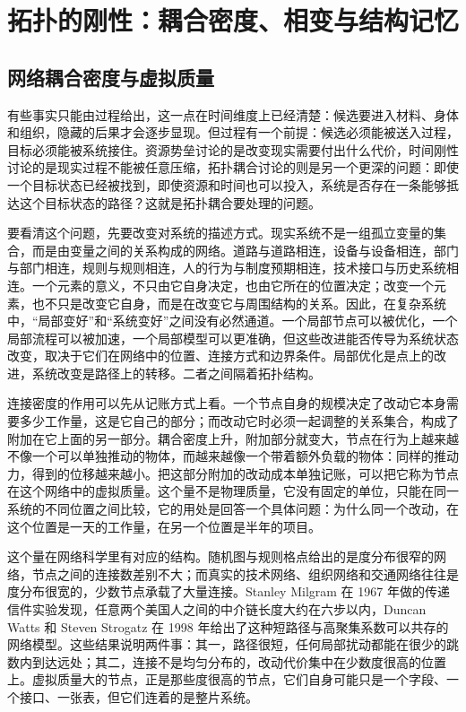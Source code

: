 \section{拓扑的刚性：耦合密度、相变与结构记忆}

\subsection{网络耦合密度与虚拟质量}

有些事实只能由过程给出，这一点在时间维度上已经清楚：候选要进入材料、身体和组织，隐藏的后果才会逐步显现。但过程有一个前提：候选必须能被送入过程，目标必须能被系统接住。资源势垒讨论的是改变现实需要付出什么代价，时间刚性讨论的是现实过程不能被任意压缩，拓扑耦合讨论的则是另一个更深的问题：即使一个目标状态已经被找到，即使资源和时间也可以投入，系统是否存在一条能够抵达这个目标状态的路径？这就是拓扑耦合要处理的问题。


要看清这个问题，先要改变对系统的描述方式。现实系统不是一组孤立变量的集合，而是由变量之间的关系构成的网络。道路与道路相连，设备与设备相连，部门与部门相连，规则与规则相连，人的行为与制度预期相连，技术接口与历史系统相连。一个元素的意义，不只由它自身决定，也由它所在的位置决定；改变一个元素，也不只是改变它自身，而是在改变它与周围结构的关系。因此，在复杂系统中，“局部变好”和“系统变好”之间没有必然通道。一个局部节点可以被优化，一个局部流程可以被加速，一个局部模型可以更准确，但这些改进能否传导为系统状态改变，取决于它们在网络中的位置、连接方式和边界条件。局部优化是点上的改进，系统改变是路径上的转移。二者之间隔着拓扑结构。

连接密度的作用可以先从记账方式上看。一个节点自身的规模决定了改动它本身需要多少工作量，这是它自己的部分；而改动它时必须一起调整的关系集合，构成了附加在它上面的另一部分。耦合密度上升，附加部分就变大，节点在行为上越来越不像一个可以单独推动的物体，而越来越像一个带着额外负载的物体：同样的推动力，得到的位移越来越小。把这部分附加的改动成本单独记账，可以把它称为节点在这个网络中的虚拟质量。这个量不是物理质量，它没有固定的单位，只能在同一系统的不同位置之间比较，它的用处是回答一个具体问题：为什么同一个改动，在这个位置是一天的工作量，在另一个位置是半年的项目。

这个量在网络科学里有对应的结构。随机图与规则格点给出的是度分布很窄的网络，节点之间的连接数差别不大；而真实的技术网络、组织网络和交通网络往往是度分布很宽的，少数节点承载了大量连接。Stanley Milgram 在 1967 年做的传递信件实验发现，任意两个美国人之间的中介链长度大约在六步以内\cite{milgram1967smallworld,travers1969experimental}，Duncan Watts 和 Steven Strogatz 在 1998 年给出了这种短路径与高聚集系数可以共存的网络模型\cite{watts1998collective}。这些结果说明两件事：其一，路径很短，任何局部扰动都能在很少的跳数内到达远处；其二，连接不是均匀分布的，改动代价集中在少数度很高的位置上。虚拟质量大的节点，正是那些度很高的节点，它们自身可能只是一个字段、一个接口、一张表，但它们连着的是整片系统。


